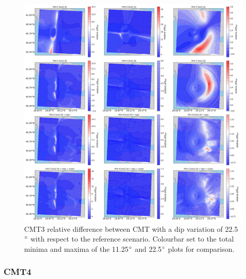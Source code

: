 \documentclass[../Text/00main.tex]{subfiles}
\begin{document}
\begin{figure}[!h]
    \centering
    \includegraphics[width=1\linewidth,trim = 2cm 5cm 1cm 5cm, clip]{images_results/dip_variation_epsilon25_sc3.png}
    \caption{CMT3 relative difference between CMT with a dip variation of 22.5$\degree$ with respect to the reference scenario. Colourbar set to the total minima and maxima of the 11.25$\degree$ and 22.5$\degree$ plots for comparison.}
    \label{fig:ref_eps25-2}
\end{figure}

\FloatBarrier

\subsubsection{CMT4}
\end{document}
